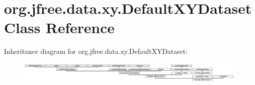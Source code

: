 \hypertarget{classorg_1_1jfree_1_1data_1_1xy_1_1_default_x_y_dataset}{}\section{org.\+jfree.\+data.\+xy.\+Default\+X\+Y\+Dataset Class Reference}
\label{classorg_1_1jfree_1_1data_1_1xy_1_1_default_x_y_dataset}
Inheritance diagram for org.\+jfree.\+data.\+xy.\+Default\+X\+Y\+Dataset\+:\begin{figure}[H]
\begin{center}
\leavevmode
\includegraphics[height=1.025641cm]{classorg_1_1jfree_1_1data_1_1xy_1_1_default_x_y_dataset}
\end{center}
\end{figure}
